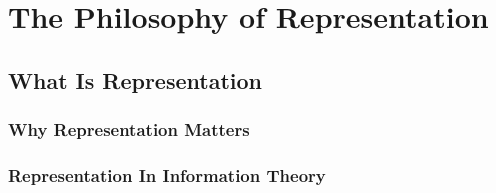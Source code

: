 \chapter{The Philosophy of Representation}
\section{What Is Representation}
\subsection{Why Representation Matters}
\subsection{Representation In Information Theory}